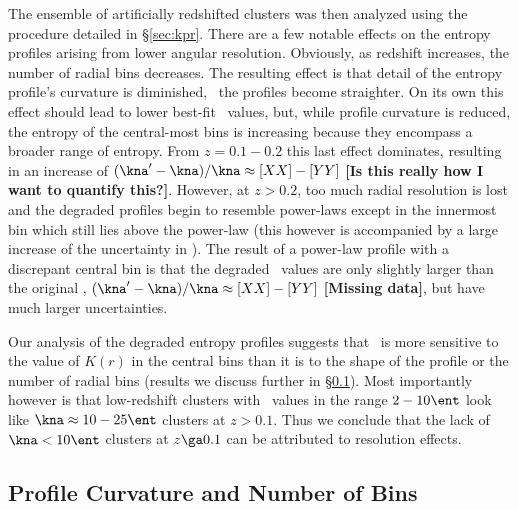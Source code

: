 \documentclass{emulateapj}
\begin{document}
The ensemble of artificially redshifted clusters was then analyzed
using the procedure detailed in \S\ref{sec:kpr}. There are a few
notable effects on the entropy profiles arising from lower angular
resolution. Obviously, as redshift increases, the number of radial
bins decreases. The resulting effect is that detail of the entropy
profile's curvature is diminished, \eg\ the profiles become
straighter. On its own this effect should lead to lower best-fit
\kna\ values, but, while profile curvature is reduced, the entropy of
the central-most bins is increasing because they encompass a broader
range of entropy. From $z = 0.1-0.2$ this last effect dominates,
resulting in an increase of $(\kna^{\prime}-\kna)/\kna \approx
[XX]-[YY]$ {\bf{[Is this really how I want to quantify
      this?]}}. However, at $z > 0.2$, too much radial resolution is
lost and the degraded profiles begin to resemble power-laws except in
the innermost bin which still lies above the power-law (this however
is accompanied by a large increase of the uncertainty in \kna). The
result of a power-law profile with a discrepant central bin is that
the degraded \kna\ values are only slightly larger than the original
\kna, $(\kna^{\prime}-\kna)/\kna \approx [XX]-[YY]$ {\bf{[Missing
      data]}}, but have much larger uncertainties.

Our analysis of the degraded entropy profiles suggests that \kna\ is
more sensitive to the value of $K(r)$ in the central bins than it is
to the shape of the profile or the number of radial bins (results we
discuss further in \S\ref{sec:curve}). Most importantly however is
that low-redshift clusters with \kna\ values in the range $2-10 \ent$
look like $\kna \approx 10-25 \ent$ clusters at $z > 0.1$. Thus we
conclude that the lack of $\kna < 10 \ent$ clusters at $z \ga 0.1$ can
be attributed to resolution effects.

\subsection{Profile Curvature and Number of Bins}
\label{sec:curve}
\end{document}
